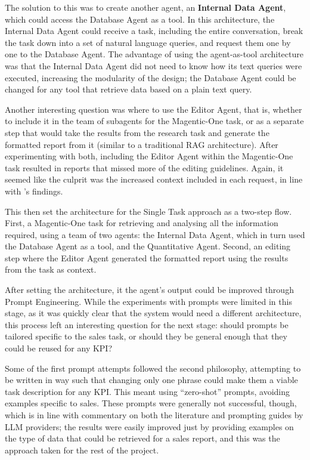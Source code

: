 \documentclass[a4paper]{report}
\begin{document}
The solution to this was to create another agent, an \textbf{Internal Data Agent}, which could access the Database Agent as a tool. In this architecture, the Internal Data Agent could receive a task, including the entire conversation, break the task down into a set of natural language queries, and request them one by one to the Database Agent. The advantage of using the agent-as-tool architecture was that the Internal Data Agent did not need to know how its text queries were executed, increasing the modularity of the design; the Database Agent could be changed for any tool that retrieve data based on a plain text query.

Another interesting question was where to use the Editor Agent, that is, whether to include it in the team of subagents for the Magentic-One task, or as a separate step that would take the results from the research task and generate the formatted report from it (similar to a traditional RAG architecture). After experimenting with both, including the Editor Agent within the Magentic-One task resulted in reports that missed more of the editing guidelines. Again, it seemed like the culprit was the increased context included in each request, in line with \cite{veseli2025positionalbiasesshiftinputs}'s findings.

This then set the architecture for the Single Task approach as a two-step flow. First, a Magentic-One task for retrieving and analysing all the information required, using a team of two agents: the Internal Data Agent, which in turn used the Database Agent as a tool, and the Quantitative Agent. Second, an editing step where the Editor Agent generated the formatted report using the results from the task as context.

After setting the architecture, it the agent's output could be improved through Prompt Engineering. While the experiments with prompts were limited in this stage, as it was quickly clear that the system would need a different architecture, this process left an interesting question for the next stage: should prompts be tailored specific to the sales task, or should they be general enough that they could be reused for any KPI?

Some of the first prompt attempts followed the second philosophy, attempting to be written in way such that changing only one phrase could make them a viable task description for any KPI. This meant using ``zero-shot'' prompts, avoiding examples specific to sales. These prompts were generally not successful, though, which is in line with commentary on both the literature and prompting guides by LLM providers; the results were easily improved just by providing examples on the type of data that could be retrieved for a sales report, and this was the approach taken for the rest of the project.
\end{document}
